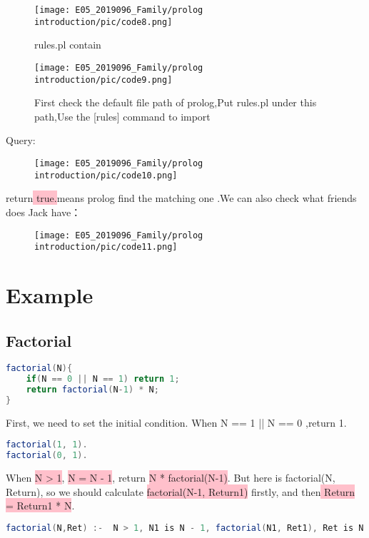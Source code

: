 \documentclass[a4paper, 11pt]{article}
\begin{document}
\begin{figure}[H]
\centering
\texttt{[image: E05\_2019096\_Family/prolog introduction/pic/code8.png]}
\caption{rules.pl contain}
\end{figure}

\begin{figure}[H]
\centering
\texttt{[image: E05\_2019096\_Family/prolog introduction/pic/code9.png]}
\label{fig:label}
\caption{First check the default file path of prolog,Put rules.pl under this path,Use the [rules] command to import}
\end{figure}

Query:
\begin{figure}[H]
\centering
\texttt{[image: E05\_2019096\_Family/prolog introduction/pic/code10.png]}
\end{figure}

return\colorbox{pink}{\color{black} true.}means prolog find the matching one .We can also check what friends does Jack have：
\begin{figure}[H]
\centering
\texttt{[image: E05\_2019096\_Family/prolog introduction/pic/code11.png]}
\end{figure}

\section{Example}
\subsection{Factorial}
\begin{lstlisting}[language={java}]
factorial(N){
    if(N == 0 || N == 1) return 1;
    return factorial(N-1) * N;
}
\end{lstlisting}
First, we need to set the initial condition. When N == 1 || N == 0 ,return 1.
\begin{lstlisting}[language={java}]
factorial(1, 1).
factorial(0, 1).
\end{lstlisting}

When \colorbox{pink}{\color{black} N > 1}, \colorbox{pink}{\color{black} N = N - 1}, return \colorbox{pink}{\color{black} N * factorial(N-1)}. But here is factorial(N, Return), so we should calculate \colorbox{pink}{\color{black} factorial(N-1, Return1)} firstly, and then\colorbox{pink}{\color{black} Return = Return1 * N}.
\begin{lstlisting}[language={java}]
factorial(N,Ret) :-  N > 1, N1 is N - 1, factorial(N1, Ret1), Ret is N * Ret1.
\end{lstlisting}
\end{document}
